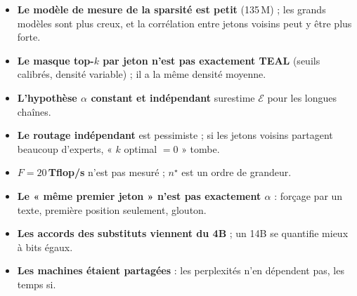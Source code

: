\begin{faux}
\begin{itemize}
\item \textbf{Le modèle de mesure de la sparsité est petit} (135\,M) ; les grands modèles sont plus creux, et la corrélation entre jetons voisins peut y être plus forte.
\item \textbf{Le masque top-$k$ par jeton n'est pas exactement TEAL} (seuils calibrés, densité variable) ; il a la même densité moyenne.
\item \textbf{L'hypothèse $\alpha$ constant et indépendant} surestime $\mathcal E$ pour les longues chaînes.
\item \textbf{Le routage indépendant} est pessimiste ; si les jetons voisins partagent beaucoup d'experts, « $k$ optimal $= 0$ » tombe.
\item \textbf{$F = 20$\,Tflop/s} n'est pas mesuré ; $n^\star$ est un ordre de grandeur.
\item \textbf{Le « même premier jeton » n'est pas exactement $\alpha$} : forçage par un texte, première position seulement, glouton.
\item \textbf{Les accords des substituts viennent du 4B} ; un 14B se quantifie mieux à bits égaux.
\item \textbf{Les machines étaient partagées} : les perplexités n'en dépendent pas, les temps si.
\end{itemize}
\end{faux}
